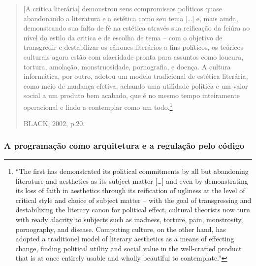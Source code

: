 \begin{quote}
[A crítica literária] demonstrou seus compromissos políticos quase abandonando a literatura e a estética como seu tema [\ldots] e, mais ainda, demonstrando sua falta de fé na estética através sua reificação da feiúra ao nível do estilo da critica e de escolha de tema – com o objetivo de transgredir e destabilizar os cânones literários a fins políticos, os teóricos culturais agora estão com alacridade pronta para assuntos como loucura, tortura, amolação, monstruosidade, pornografia, e doença. A cultura informática, por outro, adotou um modelo tradicional de estética literária, como meio de mudança efetiva, achando uma utilidade política e um valor social a um produto bem acabado, que é no mesmo tempo inteiramente operacional e lindo a contemplar como um todo.\footnote{“The first has demonstrated its political commitments by all but abandoning literature and aesthetics as its subject matter [\ldots] and even by demonstrating its loss of faith in aesthetics through its reification of ugliness at the level of critical style and choice of subject matter – with the goal of transgressing and destabilizing the literary canon for political effect, cultural theorists now turn with ready alacrity to subjects such as madness, torture, pain, monstrosity, pornography, and disease. Computing culture, on the other hand, has adopted a traditionel model of literary aesthetics as a means of effecting change, finding political utility and social value in the well-crafted product that is at once entirely usable and wholly beautiful to contemplate.”}
\begin{flushright}
BLACK, 2002, p.20.
\end{flushright}
\end{quote}

\subsubsection{A programação como arquitetura e a regulação pelo código} \label{2.3.1.b}

